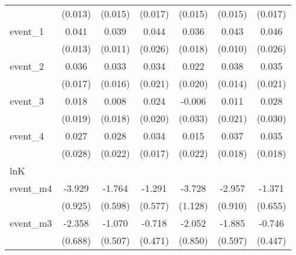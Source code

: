 {\begin{tabular}{l*{6}{c}}
            &     (0.013)         &     (0.015)         &     (0.017)         &     (0.015)         &     (0.015)         &     (0.017)         \\
[1em]
event\_1     &       0.041\sym{**} &       0.039\sym{***}&       0.044         &       0.036\sym{*}  &       0.043\sym{***}&       0.046         \\
            &     (0.013)         &     (0.011)         &     (0.026)         &     (0.018)         &     (0.010)         &     (0.026)         \\
[1em]
event\_2     &       0.036\sym{*}  &       0.033\sym{*}  &       0.034         &       0.022         &       0.038\sym{**} &       0.035         \\
            &     (0.017)         &     (0.016)         &     (0.021)         &     (0.020)         &     (0.014)         &     (0.021)         \\
[1em]
event\_3     &       0.018         &       0.008         &       0.024         &      -0.006         &       0.011         &       0.028         \\
            &     (0.019)         &     (0.018)         &     (0.020)         &     (0.033)         &     (0.021)         &     (0.030)         \\
[1em]
event\_4     &       0.027         &       0.028         &       0.034\sym{*}  &       0.015         &       0.037\sym{*}  &       0.035         \\
            &     (0.028)         &     (0.022)         &     (0.017)         &     (0.022)         &     (0.018)         &     (0.018)         \\
\hline
lnK         &                     &                     &                     &                     &                     &                     \\
event\_m4    &      -3.929\sym{***}&      -1.764\sym{**} &      -1.291\sym{*}  &      -3.728\sym{***}&      -2.957\sym{**} &      -1.371\sym{*}  \\
            &     (0.925)         &     (0.598)         &     (0.577)         &     (1.128)         &     (0.910)         &     (0.655)         \\
[1em]
event\_m3    &      -2.358\sym{***}&      -1.070\sym{*}  &      -0.718         &      -2.052\sym{*}  &      -1.885\sym{**} &      -0.746         \\
            &     (0.688)         &     (0.507)         &     (0.471)         &     (0.850)         &     (0.597)         &     (0.447)         \\

\end{tabular}}

